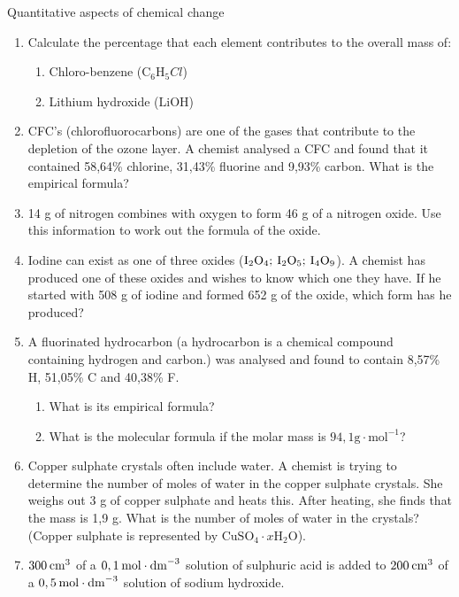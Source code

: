 \begin{eocexercises}{Quantitative aspects of chemical change}
\begin{enumerate}[noitemsep, label=\textbf{\arabic*}. ]
\item Calculate the percentage that each element contributes to the overall mass of:
\label{m38712*id6334}\begin{enumerate}[noitemsep, label=\textbf{\alph*}. ] 
            \item Chloro-benzene (${\mathrm{C}}_{6}{\mathrm{H}}_{5}Cl$)\item Lithium hydroxide ($\mathrm{LiOH}$)\end{enumerate}
\item CFC's (chlorofluorocarbons) are one of the gases that contribute to the depletion of the ozone layer. A chemist analysed a CFC and found that it contained 58,64\% chlorine, 31,43\% fluorine and 9,93\% carbon. What is the empirical formula?\newline
\item 14 g of nitrogen combines with oxygen to form 46 g of a nitrogen oxide. Use this information to work out the formula of the oxide.\newline
            \item Iodine can exist as one of three oxides (${\mathrm{I}}_{2}{\mathrm{O}}_{4};\phantom{\rule{2pt}{0ex}}{\mathrm{I}}_{2}{\mathrm{O}}_{5};\phantom{\rule{2pt}{0ex}}{\mathrm{I}}_{4}{\mathrm{O}}_{9}$). A chemist has produced one of these oxides and wishes to know which one they have. If he started with 508 g of iodine and formed 652 g of the oxide, which form has he produced?\newline
            \item A fluorinated hydrocarbon (a hydrocarbon is a chemical compound containing hydrogen and carbon.) was analysed and found to contain 8,57\% H, 51,05\% C and 40,38\% F.\label{m38712*id73222}\begin{enumerate}[noitemsep, label=\textbf{\alph*}. ] 
            \item What is its empirical formula?\item What is the molecular formula if the molar mass is $94,1\mathrm{g}\cdot {\mathrm{mol}}^{-1}$?\end{enumerate}
                \item Copper sulphate crystals often include water. A chemist is trying to determine the number of moles of water in the copper sulphate crystals. She weighs out 3 g of copper sulphate and heats this. After heating, she finds that the mass is 1,9 g. What is the number of moles of water in the crystals? (Copper sulphate is represented by ${\mathrm{CuSO}}_{4}\cdot x{\mathrm{H}}_{2}\mathrm{O}$).        \label{m38712*uid147}\item $300\phantom{\rule{2pt}{0ex}}{\mathrm{cm}}^{3}$ of a $0,1\phantom{\rule{2pt}{0ex}}\mathrm{mol}\ensuremath{\cdot}{\mathrm{dm}}^{-3}$ solution of sulphuric acid is added to $200\phantom{\rule{2pt}{0ex}}{\mathrm{cm}}^{3}$ of a $0,5\phantom{\rule{2pt}{0ex}}\mathrm{mol}\ensuremath{\cdot}{\mathrm{dm}}^{-3}$ solution of sodium hydroxide.

\end{enumerate}
\end{eocexercises}
